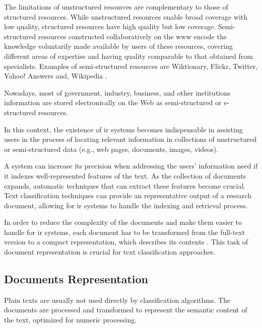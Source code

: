 The limitations of unstructured resources are complementary to those of structured resources. While unstructured resources enable broad coverage with low quality, structured resources have high quality but low coverage. Semi-structured resources constructed collaboratively on the \gls{www} encode the knowledge voluntarily made available by users of these resources, covering different areas of expertise and having quality comparable to that obtained from specialists. Examples of semi-structured resources are Wiktionary, Flickr, Twitter, Yahoo! Answers and, Wikipedia \cite{hovy2013collaboratively}.

Nowadays, most of government, industry, business, and other institutions information are stored electronically on the Web as semi-structured or e-structured resources.

In this context, the existence of \gls{ir} systems becomes indispensable in assisting users in the process of locating relevant information in collections of unstructured or semi-structured data (e.g., web pages, documents, images, videos).  


A system can increase its precision when addressing the users' information need if it indexes well-represented features of the text. As the collection of documents expands, automatic techniques that can extract these features become crucial. Text classification techniques can provide an representative output of a research document, allowing for \gls{ir} systems to handle the indexing and retrieval process.


In order to reduce the complexity of the documents and make them easier to handle for \gls{ir} systems, each document has to be transformed from the full-text version to a compact representation, which describes its contents \cite{meadow1992text}. This task of document representation is crucial for text classification approaches. 

\subsection{\hspace*{3pt}Documents Representation}


Plain texts are usually not used directly by classification algorithms.  The documents are processed and transformed to represent the semantic content of the text, optimized for numeric processing.


